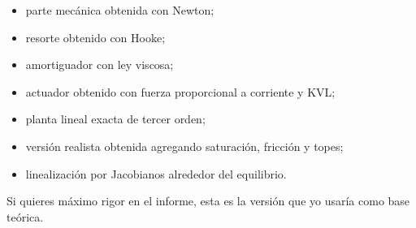 \documentclass[11pt]{article}
\begin{document}
\begin{itemize}[leftmargin=1.2cm]
\item parte mec\'anica obtenida con Newton;
\item resorte obtenido con Hooke;
\item amortiguador con ley viscosa;
\item actuador obtenido con fuerza proporcional a corriente y KVL;
\item planta lineal exacta de tercer orden;
\item versi\'on realista obtenida agregando saturaci\'on, fricci\'on y topes;
\item linealizaci\'on por Jacobianos alrededor del equilibrio.
\end{itemize}

Si quieres m\'aximo rigor en el informe, esta es la versi\'on que yo usar\'ia como base te\'orica.
\end{document}
